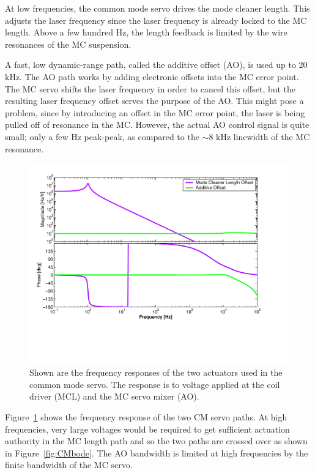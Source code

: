 At low frequencies, the common mode servo drives the mode cleaner length. This
adjusts the laser frequency since the laser frequency is already locked to the
MC length. Above a few hundred Hz, the length feedback is limited by the
wire resonances of the MC suspension.

A fast, low dynamic-range path, called the additive offset (AO), is used up to 20 kHz.
The AO path works by adding electronic offsets into the MC error
point. The MC servo shifts the laser frequency in order to cancel this offset,
but the resulting laser frequency offset serves the purpose of the AO. 
This might pose a problem, since by introducing an offset in the MC
error point, the laser is being pulled off of resonance in the MC. However,
the actual AO control signal is quite small; only a few Hz peak-peak, as 
compared to the $\sim$8 kHz linewidth of the MC resonance.


\begin{figure}[!h]
\centerline{\includegraphics[angle=0,width=6.5in]{Figures/Chap5/cm_acts.pdf}}
\caption[CM Actuators]{Shown are the frequency responses of the two actuators
                       used in the common mode servo. The response is to voltage
                       applied at the coil driver (MCL) and the MC servo mixer
                       (AO).}
\label{fig:CMactuators}
\end{figure}


Figure~\ref{fig:CMactuators} shows the frequency response of the two CM servo
paths. At high frequencies, very large voltages would be required to get
sufficient actuation authority in the MC length path and so the two paths
are crossed over as shown in Figure~\ref{fig:CMbode}. The AO bandwidth is
limited at high frequencies by the finite bandwidth of the MC servo.


